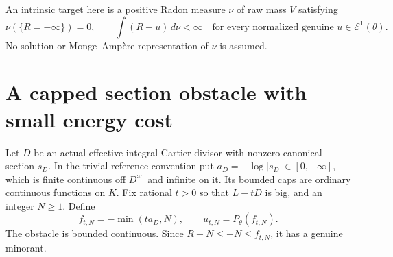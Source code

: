\documentclass[11pt]{article}
\newcommand{\Eone}{\mathcal E^1}
\begin{document}
An intrinsic target here is a positive Radon measure $\nu$ of raw mass
$V$ satisfying
\[
 \nu(\{R=-\infty\})=0,\qquad
 \int(R-u)\,d\nu<\infty
 \quad\text{for every normalized genuine }u\in\Eone(\theta).
                                                        \tag{1}
\]
No solution or Monge--Amp\`ere representation of $\nu$ is assumed.

\section{A capped section obstacle with small energy cost}
Let $D$ be an actual effective integral Cartier divisor with nonzero
canonical section $s_D$. In the trivial reference convention put
$a_D=-\log|s_D|\in[0,+\infty]$, which is finite continuous off
$D^{\mathrm{an}}$ and infinite on it. Its bounded caps are ordinary
continuous functions on $K$. Fix rational $t>0$ so that $L-tD$ is big,
and an integer $N\geq1$. Define
\[
 f_{t,N}=-\min(t a_D,N),\qquad u_{t,N}=P_\theta(f_{t,N}).
                                                        \tag{2}
\]
The obstacle is bounded continuous. Since $R-N\leq -N\leq f_{t,N}$,
it has a genuine minorant.
\end{document}
